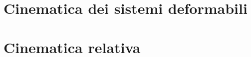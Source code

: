 \documentclass[letterpaper,10pt,italian]{jupyterBook}
\begin{document}
\section{Cinematica dei sistemi deformabili}
\label{\detokenize{ch/mechanics/kinematics-deformable:cinematica-dei-sistemi-deformabili}}\label{\detokenize{ch/mechanics/kinematics-deformable::doc}}
\sphinxstepscope


\section{Cinematica relativa}
\label{\detokenize{ch/mechanics/kinematics-relative:cinematica-relativa}}\label{\detokenize{ch/mechanics/kinematics-relative:physics-hs-mechanics-kinematics-relative}}\label{\detokenize{ch/mechanics/kinematics-relative::doc}}
\sphinxstepscope
\end{document}
